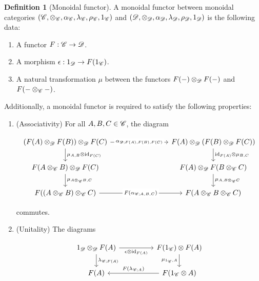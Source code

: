 \documentclass{article}
\theoremstyle{definition}
\newtheorem*{definition}{Definition}
\numberwithin{figure}{section}
\begin{document}
\begin{definition}[Monoidal functor] A monoidal functor between monoidal categories $(\mathscr{C},\otimes_{\mathscr{C}}, \alpha_{\mathscr{C}},\lambda_{\mathscr{C}},\rho_{\mathscr{C}},1_{\mathscr{C}})$ and $(\mathscr{D},\otimes_{\mathscr{D}},\alpha_{\mathscr{D}},\lambda_{\mathscr{D}},\rho_{\mathscr{D}},1_{\mathscr{D}})$ is the following data:

\begin{enumerate}
\item A functor $F: \mathscr{C}\to \mathscr{D}$.
\item A morphism $\epsilon:1_{\mathscr{D}}\to F(1_{\mathscr{C}})$.
\item A natural transformation $\mu$ between the functors $F(\--)\otimes_{\mathscr{D}}F(\--)$ and $F(\--\otimes_{\mathscr{C}}\--)$.
\end{enumerate}

Additionally, a monoidal functor is required to satisfy the following properties:

\begin{enumerate}
\item (Associativity) For all $A,B,C\in \mathscr{C}$, the diagram

\[\begin{tikzcd}
	{(F(A)\otimes_{\Dcat}F(B))\otimes_{\Dcat}F(C)} &&& {F(A)\otimes_{\Dcat}(F(B)\otimes_{\Dcat}F(C))} \\
	{F(A\otimes_{\Ccat}B)\otimes_{\Dcat}F(C)} &&& {F(A)\otimes_{\Dcat}F(B\otimes_{\Ccat}C)} \\
	{F((A\otimes_{\Ccat} B)\otimes_{\Ccat}C)} && {} & {F(A\otimes_{\Ccat}B\otimes_{\Ccat}C)}
	\arrow["{\mu_{A,B}\otimes \text{id}_{F(C)}}", from=1-1, to=2-1]
	\arrow["{\mu_{A\otimes_{\Ccat}B,C}}", from=2-1, to=3-1]
	\arrow["{\mu_{A,B\otimes_{\Ccat}C}}", from=2-4, to=3-4]
	\arrow["{\text{id}_{F(A)}\otimes\mu_{B,C}}", from=1-4, to=2-4]
	\arrow["{F(\alpha_{\Ccat;A,B,C})}"{description}, from=3-1, to=3-4]
	\arrow["{\alpha_{\Dcat;F(A),F(B),F(C)}}"{description}, from=1-1, to=1-4]
\end{tikzcd}\]

commutes.
\item (Unitality) The diagrams

\[\begin{tikzcd}
	{1_{\Dcat}\otimes_{\Dcat}F(A)} && {F(1_{\Ccat})\otimes F(A)} \\
	{F(A)} && {F(1_{\Ccat}\otimes A)}
	\arrow["{\lambda_{\Ccat;F(A)}}", from=1-1, to=2-1]
	\arrow["{F(\lambda_{\Ccat;A})}"', from=2-3, to=2-1]
	\arrow["{\mu_{1_{\Ccat},A}}"', from=1-3, to=2-3]
	\arrow["{\epsilon\otimes \text{id}_{F(A)}}"', from=1-1, to=1-3]
\end{tikzcd}\]


\end{enumerate}
\end{definition}
\end{document}
